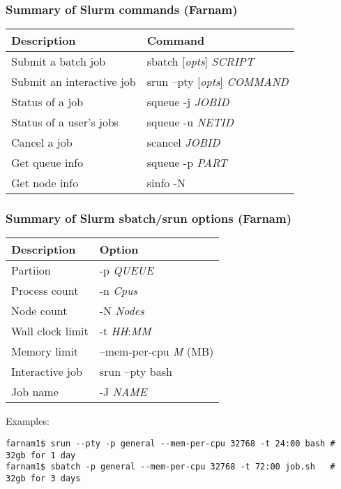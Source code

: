 \documentclass[10pt]{beamer}
\newcommand\smallfont{\fontsize{8pt}{7.2}\selectfont}
\begin{document}
\begin{frame}
\frametitle{Summary of Slurm commands (Farnam)}
\begin{tabular}{|l|l|}
\hline
\textbf{Description} & \textbf{Command} \\
\hline
Submit a batch job & sbatch [\textit{opts}] \textit{SCRIPT} \\
\hline
Submit an interactive job & srun --pty [\textit{opts}] \textit{COMMAND} \\
\hline
Status of a job & squeue -j \textit{JOBID} \\
\hline
Status of a user's jobs & squeue -u \textit{NETID} \\
\hline
Cancel a job & scancel \textit{JOBID} \\
\hline
Get queue info & squeue -p \textit{PART} \\
\hline
Get node info & sinfo -N \\
\hline
\end{tabular}
\end{frame}

\begin{frame}[fragile]
\frametitle{Summary of Slurm sbatch/srun options (Farnam)}
\begin{tabular}{|l|l|}
\hline
\textbf{Description} & \textbf{Option} \\
\hline
Partiion & -p \textit{QUEUE} \\
\hline
Process count & -n \textit{Cpus} \\
\hline
Node count & -N \textit{Nodes} \\
\hline
Wall clock limit & -t \textit{HH}:\textit{MM} \\
\hline
Memory limit & --mem-per-cpu \textit{M} (MB)\\
\hline
Interactive job & srun --pty bash \\
\hline
Job name & -J \textit{NAME} \\
\hline
\end{tabular}

\vskip10pt
Examples:
\smallfont
\begin{verbatim}
farnam1$ srun --pty -p general --mem-per-cpu 32768 -t 24:00 bash # 32gb for 1 day
farnam1$ sbatch -p general --mem-per-cpu 32768 -t 72:00 job.sh   # 32gb for 3 days
\end{verbatim}
\end{frame}
\end{document}
